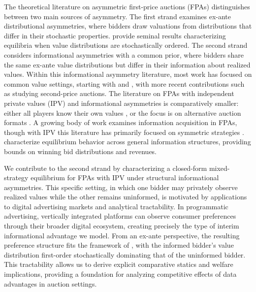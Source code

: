 \documentclass[11pt]{article}
\theoremstyle{plain}
\theoremstyle{definition}
\theoremstyle{plain}
\theoremstyle{plain}
\theoremstyle{plain}
\theoremstyle{plain}
\numberwithin{equation}{section}
\begin{document}
\vspace{2mm}
\noindent The theoretical literature on asymmetric first-price auctions (FPAs) distinguishes between two main sources of asymmetry. The first strand examines ex-ante distributional asymmetries, where bidders draw valuations from distributions that differ in their stochastic properties. \textcite{maskinAsymmetricAuctions2000} provide seminal results characterizing equilibria when value distributions are stochastically ordered. The second strand considers informational asymmetries with a common prior, where bidders share the same ex-ante value distributions but differ in their information about realized values. Within this informational asymmetry literature, most work has focused on common value settings, starting with \textcite{wilsonCompetitiveBiddingAsymmetric1967} and \textcite{engelbrecht-wiggansCompetitiveBiddingProprietary1983}, with more recent contributions such as \textcite{abrahamPeachesLemonsCookies2020} studying second-price auctions. The literature on FPAs with independent private values (IPV) and informational asymmetries is comparatively smaller: either all players know their own values \parencite{martinez-pardinaFirstpriceAuctionsWhere2006}, or the focus is on alternative auction formats \parencite{compteWaitandSeeOptionAscending2004, miettinenInformationAcquisitionDutch2013}. A growing body of work examines information acquisition in FPAs, though with IPV this literature has primarily focused on symmetric strategies \parencite{hauschPrivateValuesAuctions1991, shiOptimalAuctionsInformation2012}. \textcite{bergemannFirstPriceAuctionsGeneral2017} characterize equilibrium behavior across general information structures, providing bounds on winning bid distributions and revenues.\par
\vspace{2mm}
\noindent We contribute to the second strand by characterizing a closed-form mixed-strategy equilibrium for FPAs with IPV under structural informational asymmetries. This specific setting, in which one bidder may privately observe realized values while the other remains uninformed, is motivated by applications to digital advertising markets and analytical tractability. In programmatic advertising, vertically integrated platforms can observe consumer preferences through their broader digital ecosystem, creating precisely the type of interim informational advantage we model. From an ex-ante perspective, the resulting preference structure fits the framework of \textcite{maskinAsymmetricAuctions2000}, with the informed bidder's value distribution first-order stochastically dominating that of the uninformed bidder. This tractability allows us to derive explicit comparative statics and welfare implications, providing a foundation for analyzing competitive effects of data advantages in auction settings.\par
\end{document}
